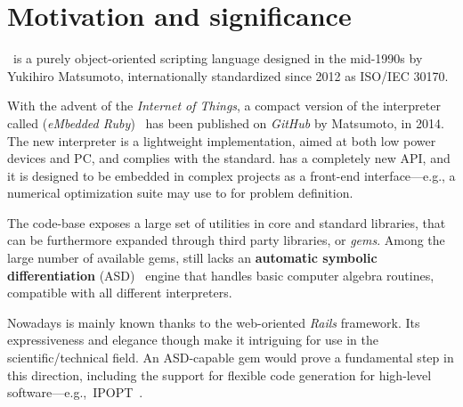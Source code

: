 
\section{Motivation and significance}
\label{sec:motivation}

\Ruby \cite{flanagan2008ruby}~is a purely object-oriented scripting language designed in the mid-1990s by Yukihiro Matsumoto, internationally standardized since 2012 as ISO/IEC 30170.

With the advent of the \emph{Internet of Things}, a compact version of the \Ruby interpreter called \Mruby (\emph{eMbedded Ruby})~\cite{tanaka2015mruby} has been published on \emph{GitHub} by Matsumoto, in 2014. The new interpreter is a lightweight implementation, aimed at both low power devices and PC, and complies with the standard\cite{iso30170}. \Mruby has a completely new API, and it is designed to be embedded in complex projects as a front-end interface---e.g., a numerical optimization suite may use \Mruby to for problem definition.

The \Ruby code-base exposes a large set of utilities in core and standard libraries, that can be furthermore expanded through third party libraries, or \emph{gems}. Among the large number of available gems, \Ruby still lacks an \textbf{automatic symbolic differentiation} (ASD)~\cite{tolsma1998computational} engine that handles basic computer algebra routines, compatible with all different \Ruby interpreters.

Nowadays \Ruby is mainly known thanks to the web-oriented \emph{Rails} framework. Its expressiveness and elegance though make it intriguing for use in the scientific/technical field. An ASD-capable gem would prove a fundamental step in this direction, including the support for flexible code generation for high-level software---e.g.,\ IPOPT~\cite{wachter2009ipopt, wachter2006}\@.

